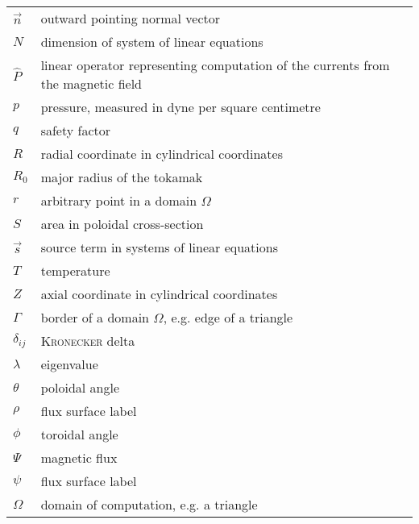 \begin{longtable}{l >{\RaggedRight}p{}}
  $\vec{n}$ & outward pointing normal vector \\
  $N$ & dimension of system of linear equations \\
  $\hat{P}$ & linear operator representing computation of the currents from the magnetic field \\
  $p$ & pressure, measured in dyne per square centimetre \\
  $q$ & safety factor \\
  $R$ & radial coordinate in cylindrical coordinates \\
  $R_{0}$ & major radius of the tokamak \\
  $r$ & arbitrary point in a domain $\Omega$ \\
  $S$ & area in poloidal cross-section \\
  $\vec{s}$ & source term in systems of linear equations \\
  $T$ & temperature \\
  $Z$ & axial coordinate in cylindrical coordinates \\
  $\Gamma$ & border of a domain $\Omega$, e.g. edge of a triangle \\
  $\delta_{ij}$ & \textsc{Kronecker} delta \\
  $\lambda$ & eigenvalue \\
  $\theta$ & poloidal angle \\
  $\rho$ & flux surface label \\
  $\phi$ & toroidal angle \\
  $\Psi$ & magnetic flux \\
  $\psi$ & flux surface label \\
  $\Omega$ & domain of computation, e.g. a triangle \\
  \bottomrule
\end{longtable}

